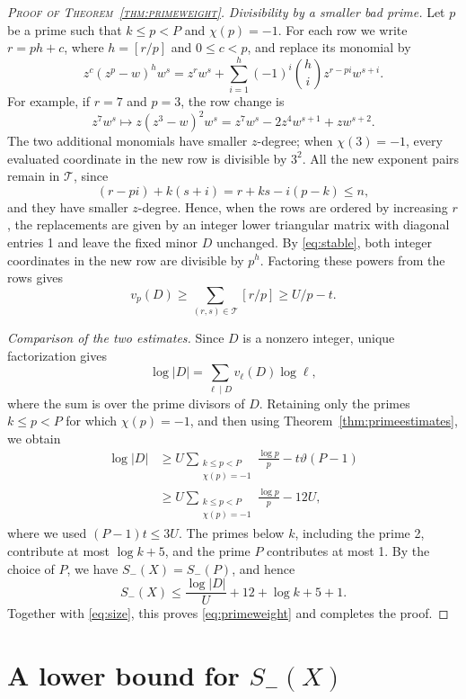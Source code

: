 \documentclass[11pt,twoside,leqno]{article}
\theoremstyle{apostol}
\newcommand{\fl}[1]{\left[#1\right]}
\begin{document}
\begin{proof}[\normalfont\scshape Proof of Theorem~\ref{thm:primeweight}]
\medskip
\noindent\textit{Divisibility by a smaller bad prime.}
Let \(p\) be a prime such that \(k\le p<P\) and \(\chi(p)=-1\). For
each row we write \(r=ph+c\), where \(h=\fl{r/p}\) and \(0\le c<p\),
and replace its monomial by
\begin{equation}\label{eq:rowchange}
 z^c(z^p-w)^hw^s
 =z^rw^s+\sum_{i=1}^h(-1)^i\binom hi z^{r-pi}w^{s+i}.
\end{equation}
For example, if \(r=7\) and \(p=3\), the row change is
\[
 z^7w^s\longmapsto z(z^3-w)^2w^s
   =z^7w^s-2z^4w^{s+1}+zw^{s+2}.
\]
The two additional monomials have smaller \(z\)-degree; when
\(\chi(3)=-1\), every evaluated coordinate in the new row is divisible by
\(3^2\).
All the new exponent pairs remain in \(\mathcal T\), since
\[
 (r-pi)+k(s+i)=r+ks-i(p-k)\le n,
\]
and they have smaller \(z\)-degree. Hence, when the rows are ordered by
increasing \(r\), the replacements are given by an integer lower triangular
matrix with diagonal entries 1 and leave the fixed minor \(D\) unchanged.
By \eqref{eq:stable}, both integer coordinates in the new row are divisible
by \(p^h\). Factoring these powers from the rows gives
\[
 v_p(D)\ge\sum_{(r,s)\in\mathcal T}\fl{r/p}\ge U/p-t.
\]

\medskip
\noindent\textit{Comparison of the two estimates.}
Since \(D\) is a nonzero integer, unique factorization gives
\[
 \log|D|=\sum_{\ell\mid D}v_\ell(D)\log\ell,
\]
where the sum is over the prime divisors of \(D\). Retaining only the primes
\(k\le p<P\) for which \(\chi(p)=-1\), and then using
Theorem~\ref{thm:primeestimates}, we obtain
\begin{align*}
 \log|D|
 &\ge U\sum_{\substack{k\le p<P\\\chi(p)=-1}}\frac{\log p}{p}
       -t\vartheta(P-1)\\
 &\ge U\sum_{\substack{k\le p<P\\\chi(p)=-1}}\frac{\log p}{p}-12U,
\end{align*}
where we used \((P-1)t\le3U\). The primes below \(k\), including the
prime 2, contribute at most \(\log k+5\), and the prime \(P\) contributes
at most 1. By the choice of \(P\), we have \(S_-(X)=S_-(P)\), and hence
\[
 S_-(X)\le\frac{\log|D|}{U}+12+\log k+5+1.
\]
Together with \eqref{eq:size}, this proves \eqref{eq:primeweight} and
completes the proof.
\end{proof}

\section{A lower bound for \texorpdfstring{\(S_-(X)\)}{S-(X)}}
\label{sec:bridge}
\end{document}
